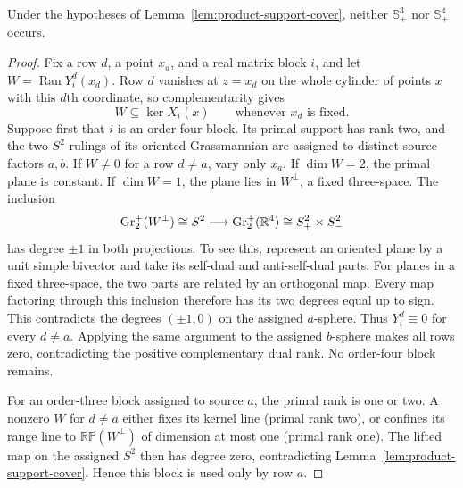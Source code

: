 \begin{lemma}
\label{lem:product-real-cylinder}
Under the hypotheses of Lemma~\ref{lem:product-support-cover}, neither
$\mathbb S_+^3$ nor $\mathbb S_+^4$ occurs.
\end{lemma}
\begin{proof}
Fix a row $d$, a point $x_d$, and a real matrix block $i$, and let
$W=\operatorname{Ran}Y_i^d(x_d)$. Row $d$ vanishes at $z=x_d$ on the whole cylinder of points
$x$ with this $d$th coordinate, so complementarity gives
\begin{equation}\label{eq:product-fixed-kernel-cylinder}
 W\subseteq\ker X_i(x)\qquad\text{whenever $x_d$ is fixed}.
\end{equation}
Suppose first that $i$ is an order-four block. Its primal support has
rank two, and the two $S^2$ rulings of its oriented Grassmannian are
assigned to distinct source factors $a,b$. If $W\ne0$ for a row
$d\ne a$, vary only $x_a$. If $\dim W=2$, the primal plane is constant.
If $\dim W=1$, the plane lies in $W^\perp$, a fixed three-space. The
inclusion
\[
 \operatorname{Gr}_2^+(W^\perp)\cong S^2
 \longrightarrow\operatorname{Gr}_2^+(\mathbb R^4)\cong S^2_+\times S^2_-
\]
has degree $\pm1$ in both projections. To see this, represent an
oriented plane by a unit simple bivector and take its self-dual and
anti-self-dual parts. For planes in a fixed three-space, the two parts
are related by an orthogonal map. Every map factoring through this
inclusion therefore has its two degrees equal up to sign. This
contradicts the degrees $(\pm1,0)$ on the assigned $a$-sphere.
Thus $Y_i^d\equiv0$ for every $d\ne a$. Applying the same argument to
the assigned $b$-sphere makes all rows zero, contradicting the
positive complementary dual rank. No order-four block remains.

For an order-three block assigned to source $a$, the primal rank is
one or two. A nonzero $W$ for $d\ne a$ either fixes its kernel line
(primal rank two), or confines its range line to
$\mathbb{RP}(W^\perp)$ of dimension at most one (primal rank one).
The lifted map on the assigned $S^2$ then has degree zero, contradicting
Lemma~\ref{lem:product-support-cover}. Hence this block is used only by row $a$.


\end{proof}
